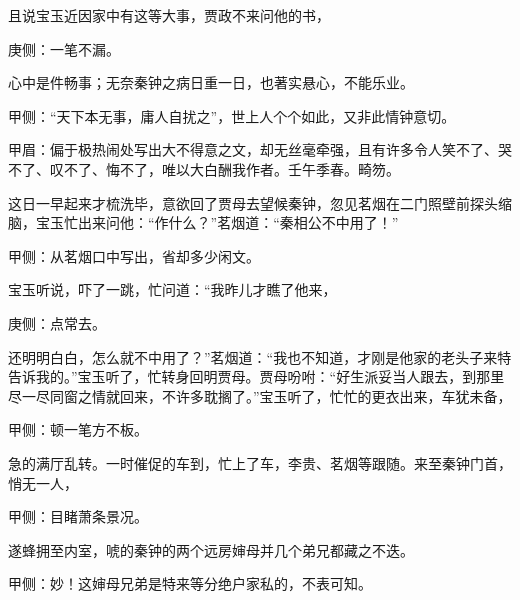 \begin{parag}
    且说宝玉近因家中有这等大事，贾政不来问他的书，\begin{note}庚侧：一笔不漏。\end{note}心中是件畅事；无奈秦钟之病日重一日，也著实悬心，不能乐业。\begin{note}甲侧：“天下本无事，庸人自扰之”，世上人个个如此，又非此情钟意切。\end{note}\begin{note}甲眉：偏于极热闹处写出大不得意之文，却无丝毫牵强，且有许多令人笑不了、哭不了、叹不了、悔不了，唯以大白酬我作者。壬午季春。畸笏。\end{note}这日一早起来才梳洗毕，意欲回了贾母去望候秦钟，忽见茗烟在二门照壁前探头缩脑，宝玉忙出来问他：“作什么？”茗烟道：“秦相公不中用了！”\begin{note}甲侧：从茗烟口中写出，省却多少闲文。\end{note}宝玉听说，吓了一跳，忙问道：“我昨儿才瞧了他来，\begin{note}庚侧：点常去。\end{note}还明明白白，怎么就不中用了？”茗烟道：“我也不知道，才刚是他家的老头子来特告诉我的。”宝玉听了，忙转身回明贾母。贾母吩咐：“好生派妥当人跟去，到那里尽一尽同窗之情就回来，不许多耽搁了。”宝玉听了，忙忙的更衣出来，车犹未备，\begin{note}甲侧：顿一笔方不板。\end{note}急的满厅乱转。一时催促的车到，忙上了车，李贵、茗烟等跟随。来至秦钟门首，悄无一人，\begin{note}甲侧：目睹萧条景况。\end{note}遂蜂拥至内室，唬的秦钟的两个远房婶母并几个弟兄都藏之不迭。\begin{note}甲侧：妙！这婶母兄弟是特来等分绝户家私的，不表可知。\end{note}
\end{parag}


